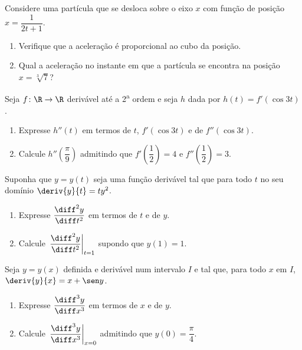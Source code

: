 \begin{exercicio}[26]
\label{ex:7.17.26}
Considere uma partícula que se desloca sobre o eixo $x$ com função de posição $x = \dfrac{1}{2t + 1}$.
\begin{enumerate}[label=\alph*)]
    \item Verifique que a aceleração é proporcional ao cubo da posição.
    \item Qual a aceleração no instante em que a partícula se encontra na posição $x = \sqrt[3]{7}$?
\end{enumerate}
\end{exercicio}

\begin{exercicio}[27]
\label{ex:7.17.27}
Seja $f\colon \R \to \R$ derivável até a 2\textsuperscript{a} ordem e seja $h$ dada por $h(t) = f'(\cos 3t)$.
\begin{enumerate}[label=\alph*)]
    \item Expresse $h''(t)$ em termos de $t$, $f'(\cos 3t)$ e de $f''(\cos 3t)$.
    \item Calcule $h''\!\left(\dfrac{\pi}{9}\right)$ admitindo que $f'\!\left(\dfrac{1}{2}\right) = 4$ e $f''\!\left(\dfrac{1}{2}\right) = 3$.
\end{enumerate}
\end{exercicio}

\begin{exercicio}[28]
\label{ex:7.17.28}
Suponha que $y = y(t)$ seja uma função derivável tal que para todo $t$ no seu domínio $\deriv{y}{t} = ty^2$.
\begin{enumerate}[label=\alph*)]
    \item Expresse $\dfrac{\diff^2 y}{\diff t^2}$ em termos de $t$ e de $y$.
    \item Calcule $\left.\dfrac{\diff^2 y}{\diff t^2}\right|_{t = 1}$ supondo que $y(1) = 1$.
\end{enumerate}
\end{exercicio}

\begin{exercicio}[29]
\label{ex:7.17.29}
Seja $y = y(x)$ definida e derivável num intervalo $I$ e tal que, para todo $x$ em $I$, $\deriv{y}{x} = x + \sen y$.
\begin{enumerate}[label=\alph*)]
    \item Expresse $\dfrac{\diff^3 y}{\diff x^3}$ em termos de $x$ e de $y$.
    \item Calcule $\left.\dfrac{\diff^3 y}{\diff x^3}\right|_{x = 0}$ admitindo que $y(0) = \dfrac{\pi}{4}$.
\end{enumerate}
\end{exercicio}

